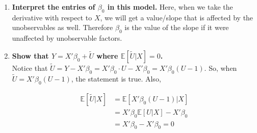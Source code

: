 \documentclass[]{article}
\newcommand{\E}{\mathbb{E}}
\begin{document}
\begin{enumerate}[label = (\roman*)]

\item \textbf{Interpret the entries of $\beta_0$ in this model.} Here, when we take the derivative with respect to $X$, we will get a value/slope that is affected by the unobservables as well. Therefore $\beta_0$ is the value of the slope if it were unaffected by unobservable factors. 


\item \textbf{Show that $Y= X'\beta_0+\tilde{U}$ where $\mathbb{E} [\tilde{U}|X] = 0$.} \\
Notice that $\tilde{U} = Y - X'\beta_0 = X'\beta_0\cdot U - X'\beta_0 = X'\beta_0(U-1)$. So, when $\tilde{U} = X'\beta_0(U-1)$, the statement is true. Also, 

\begin{align*}
\E[\tilde{U} |X] 
& = \E[X'\beta_0(U-1) |X] \\
& = X'\beta_0\E[U|X] - X'\beta_0 \\
& = X'\beta_0 - X'\beta_0 = 0 
\end{align*}



\end{enumerate}
\end{document}
